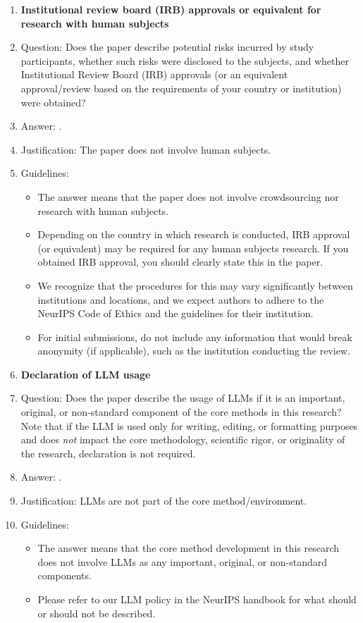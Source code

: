 \begin{enumerate}
\item {\bf Institutional review board (IRB) approvals or equivalent for research with human subjects}
    \item[] Question: Does the paper describe potential risks incurred by study participants, whether such risks were disclosed to the subjects, and whether Institutional Review Board (IRB) approvals (or an equivalent approval/review based on the requirements of your country or institution) were obtained?
    \item[] Answer: \answerNA{}.
    \item[] Justification: The paper does not involve human subjects.
    \item[] Guidelines:
    \begin{itemize}
        \item The answer \answerNA{} means that the paper does not involve crowdsourcing nor research with human subjects.
        \item Depending on the country in which research is conducted, IRB approval (or equivalent) may be required for any human subjects research. If you obtained IRB approval, you should clearly state this in the paper. 
        \item We recognize that the procedures for this may vary significantly between institutions and locations, and we expect authors to adhere to the NeurIPS Code of Ethics and the guidelines for their institution. 
        \item For initial submissions, do not include any information that would break anonymity (if applicable), such as the institution conducting the review.
    \end{itemize}

\item {\bf Declaration of LLM usage}
    \item[] Question: Does the paper describe the usage of LLMs if it is an important, original, or non-standard component of the core methods in this research? Note that if the LLM is used only for writing, editing, or formatting purposes and does \emph{not} impact the core methodology, scientific rigor, or originality of the research, declaration is not required.
    \item[] Answer: \answerNA{}.
    \item[] Justification: LLMs are not part of the core method/environment.
    \item[] Guidelines:
    \begin{itemize}
        \item The answer \answerNA{} means that the core method development in this research does not involve LLMs as any important, original, or non-standard components.
        \item Please refer to our LLM policy in the NeurIPS handbook for what should or should not be described.
    \end{itemize}

\end{enumerate}
